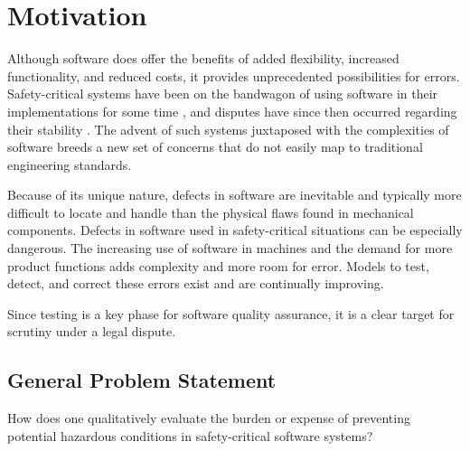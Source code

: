 \chapter{Motivation}

Although software does offer the benefits of added flexibility, increased
functionality, and reduced costs, it provides unprecedented possibilities for
errors. Safety-critical systems have been on the bandwagon of using software in
their implementations for some time \cite{Graupe78,Hurtig94}, and disputes have
since then occurred regarding their stability \cite{Leveson93,Maisel05}. The 
advent of such systems juxtaposed with the complexities of software breeds a new
set of concerns that do not easily map to traditional engineering standards.

Because of its unique nature, defects in software are inevitable and typically
more difficult to locate and handle than the physical flaws found in mechanical
components. Defects in software used in safety-critical situations can be
especially dangerous. The increasing use of software in machines and the demand
for more product functions adds complexity and more room for error. Models to
test, detect, and correct these errors exist and are continually improving.

Since testing is a key phase for software quality assurance, it is a clear
target for scrutiny under a legal dispute.

\section{General Problem Statement}
How does one qualitatively evaluate the burden or expense of preventing
potential hazardous conditions in safety-critical software systems?
